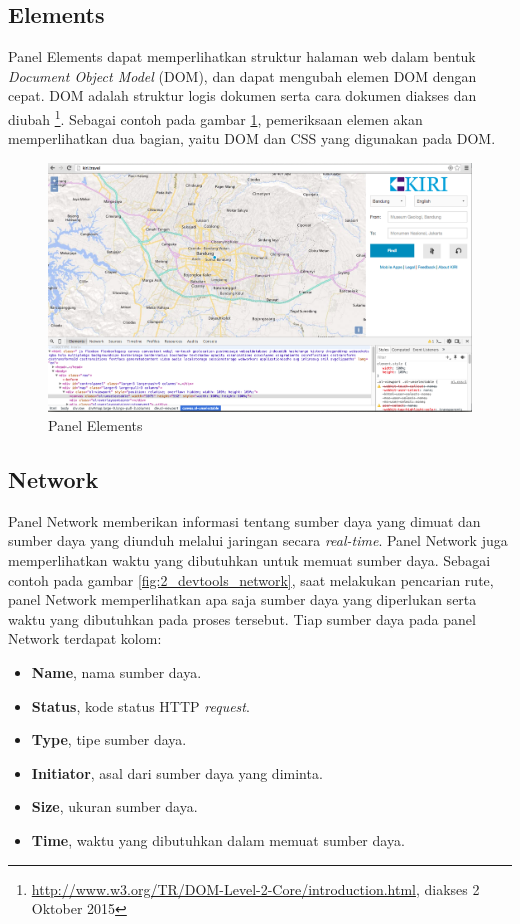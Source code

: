 \subsection{Elements}
Panel Elements dapat memperlihatkan struktur halaman web dalam bentuk \textit{Document Object Model} (DOM), dan dapat mengubah elemen DOM dengan cepat. DOM adalah struktur logis dokumen serta cara dokumen diakses dan diubah \footnote{\url{http://www.w3.org/TR/DOM-Level-2-Core/introduction.html}, diakses 2 Oktober 2015}. Sebagai contoh pada gambar \ref{fig:2_devtools_elements}, pemeriksaan elemen akan memperlihatkan dua bagian, yaitu DOM dan CSS yang digunakan pada DOM.

\begin{figure}[H]
	\centering
	\includegraphics[scale=0.3]{Gambar/devtools-elements}
	\caption{Panel Elements} 
	\label{fig:2_devtools_elements}
\end{figure}

\subsection{Network}
Panel Network memberikan informasi tentang sumber daya yang dimuat dan sumber daya yang diunduh melalui jaringan secara \textit{real-time}. Panel Network juga memperlihatkan waktu yang dibutuhkan untuk memuat sumber daya. Sebagai contoh pada gambar \ref{fig:2_devtools_network}, saat melakukan pencarian rute, panel Network memperlihatkan apa saja sumber daya yang diperlukan serta waktu yang dibutuhkan pada proses tersebut. Tiap sumber daya pada panel Network terdapat kolom:

\begin{itemize}
	\item \textbf{Name}, nama sumber daya.
	\item \textbf{Status}, kode status HTTP \textit{request}.
	\item \textbf{Type}, tipe sumber daya.
	\item \textbf{Initiator}, asal dari sumber daya yang diminta.
	\item \textbf{Size}, ukuran sumber daya.
	\item \textbf{Time}, waktu yang dibutuhkan dalam memuat sumber daya.
\end{itemize}


